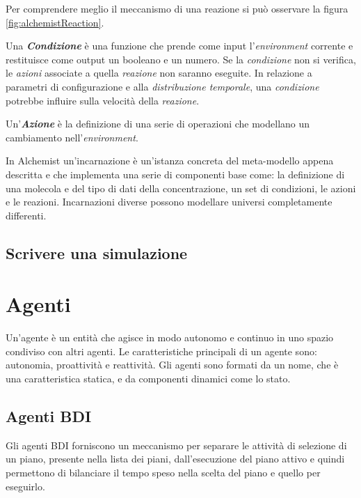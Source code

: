 \documentclass[12pt,a4paper,openright,twoside]{report}
\begin{document}
Per comprendere meglio il meccanismo di una reazione si pu\`o osservare la figura \ref{fig:alchemistReaction}.

Una \textbf{\textit{Condizione}} \`e una funzione che prende come input l'\textit{environment} corrente e restituisce come output un booleano e un numero. Se la \textit{condizione} non si verifica, le \textit{azioni} associate a quella  \textit{reazione} non saranno eseguite. In relazione a parametri di configurazione e alla \textit{distribuzione temporale}, una \textit{condizione} potrebbe influire sulla velocit\`a della \textit{reazione}.

Un'\textbf{\textit{Azione}} \`e la definizione di una serie di operazioni che modellano un cambiamento nell'\textit{environment}.

In Alchemist un'incarnazione \`e un'istanza concreta del meta-modello appena descritta e che implementa una serie di componenti base come: la definizione di una molecola e del tipo di dati della concentrazione, un set di condizioni, le azioni e le reazioni. Incarnazioni diverse possono modellare universi completamente differenti.

\section{Scrivere una simulazione}

\chapter{Agenti}
\lhead[\fancyplain{}{\bfseries\thepage}]{\fancyplain{}{\bfseries\rightmark}}
Un'agente \`e un entit\`a che agisce in modo autonomo e continuo in uno spazio condiviso con altri agenti. Le caratteristiche principali di un agente sono: autonomia, proattivit\`a e reattivit\`a. Gli agenti sono formati da un nome, che \`e una caratteristica statica, e da componenti dinamici come lo stato.

\section{Agenti BDI}
Gli agenti BDI forniscono un meccanismo per separare le attivit\`a di selezione di un piano, presente nella lista dei piani, dall'esecuzione del piano attivo e quindi permettono di bilanciare il tempo speso nella scelta del piano e quello per eseguirlo.
\end{document}
